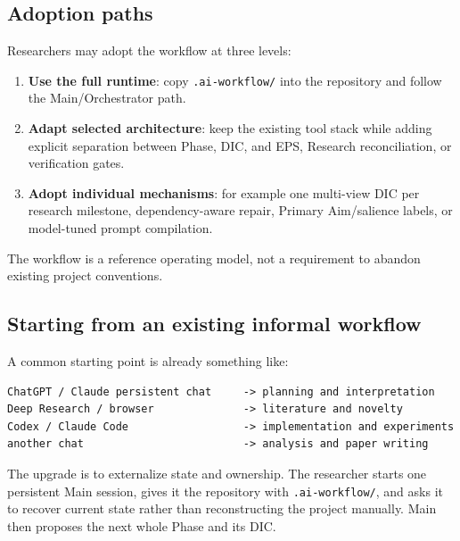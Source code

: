 \documentclass[11pt,a4paper]{article}
\begin{document}
\subsection{Adoption paths}
Researchers may adopt the workflow at three levels:
\begin{enumerate}
\item \textbf{Use the full runtime}: copy \texttt{.ai-workflow/} into the repository and follow the Main/Orchestrator path.
\item \textbf{Adapt selected architecture}: keep the existing tool stack while adding explicit separation between Phase, DIC, and EPS, Research reconciliation, or verification gates.
\item \textbf{Adopt individual mechanisms}: for example one multi-view DIC per research milestone, dependency-aware repair, Primary Aim/salience labels, or model-tuned prompt compilation.
\end{enumerate}
The workflow is a reference operating model, not a requirement to abandon existing project conventions.

\subsection{Starting from an existing informal workflow}
A common starting point is already something like:
\begin{lstlisting}[style=workflow]
ChatGPT / Claude persistent chat     -> planning and interpretation
Deep Research / browser              -> literature and novelty
Codex / Claude Code                  -> implementation and experiments
another chat                         -> analysis and paper writing
\end{lstlisting}
The upgrade is to externalize state and ownership. The researcher starts one persistent Main session, gives it the repository with \texttt{.ai-workflow/}, and asks it to recover current state rather than reconstructing the project manually. Main then proposes the next whole Phase and its DIC.
\end{document}
